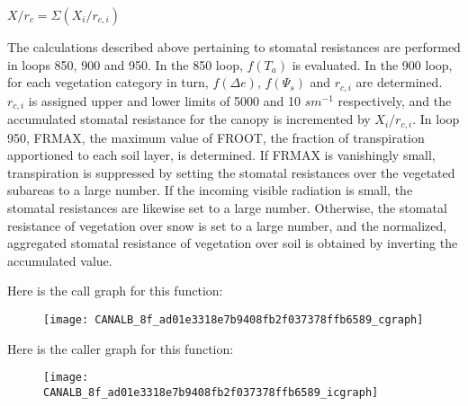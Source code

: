 $X/r_c = \Sigma (X_i / r_{c,i})$

The calculations described above pertaining to stomatal resistances are performed in loops 850, 900 and 950. In the 850 loop, $f(T_a)$ is evaluated. In the 900 loop, for each vegetation category in turn, $f(\Delta e)$, $f(\Psi_s)$ and $r_{c,i}$ are determined. $r_{c,i}$ is assigned upper and lower limits of 5000 and 10 $s m^{-1}$ respectively, and the accumulated stomatal resistance for the canopy is incremented by $X_i / r_{c,i}$. In loop 950, F\+R\+M\+A\+X, the maximum value of F\+R\+O\+O\+T, the fraction of transpiration apportioned to each soil layer, is determined. If F\+R\+M\+A\+X is vanishingly small, transpiration is suppressed by setting the stomatal resistances over the vegetated subareas to a large number. If the incoming visible radiation is small, the stomatal resistances are likewise set to a large number. Otherwise, the stomatal resistance of vegetation over snow is set to a large number, and the normalized, aggregated stomatal resistance of vegetation over soil is obtained by inverting the accumulated value.

Here is the call graph for this function\+:\nopagebreak
\begin{figure}[H]
\begin{center}
\leavevmode
\texttt{[image: CANALB\_8f\_ad01e3318e7b9408fb2f037378ffb6589\_cgraph]}
\end{center}
\end{figure}




Here is the caller graph for this function\+:\nopagebreak
\begin{figure}[H]
\begin{center}
\leavevmode
\texttt{[image: CANALB\_8f\_ad01e3318e7b9408fb2f037378ffb6589\_icgraph]}
\end{center}
\end{figure}


